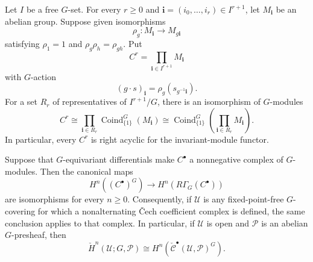 \begin{lemma}
\label{lemma-equivariant-cech-free-index}
\begin{reference}
\cite[Chapter V, \S 5.5, Proposition 5.5.4,
pp. 209--210]{Tohoku}
\end{reference}
Let $I$ be a free $G$-set. For every $r\geq 0$ and
$\mathbf{i}=(i_0,\ldots,i_r)\in I^{r+1}$, let $M_{\mathbf{i}}$ be an
abelian group. Suppose given isomorphisms
$$
\rho_g:M_{\mathbf{i}}\longrightarrow M_{g\mathbf{i}}
$$
satisfying $\rho_1=1$ and $\rho_g\rho_h=\rho_{gh}$. Put
$$
C^r=\prod_{\mathbf{i}\in I^{r+1}}M_{\mathbf{i}}
$$
with $G$-action
$$
(g\cdot s)_{\mathbf{i}}
=\rho_g(s_{g^{-1}\mathbf{i}}).
$$
For a set $R_r$ of representatives of $I^{r+1}/G$, there is an
isomorphism of $G$-modules
\begin{equation}
\label{equation-equivariant-cech-free-index-product}
C^r\cong
\prod_{\mathbf{i}\in R_r}
\operatorname{Coind}_{\{1\}}^G(M_{\mathbf{i}})
\cong
\operatorname{Coind}_{\{1\}}^G
\left(\prod_{\mathbf{i}\in R_r}M_{\mathbf{i}}\right).
\end{equation}
In particular, every $C^r$ is right acyclic for the invariant-module
functor.

Suppose that $G$-equivariant differentials make $C^\bullet$ a
nonnegative complex of $G$-modules. Then the canonical maps
$$
H^n((C^\bullet)^G)
\longrightarrow H^n(R\Gamma_G(C^\bullet))
$$
are isomorphisms for every $n\geq 0$. Consequently, if $\mathcal{U}$ is
any fixed-point-free $G$-covering for which a nonalternating \v Cech
coefficient complex is defined, the same conclusion applies to that
complex. In particular, if $\mathcal{U}$ is open and $\mathcal{P}$ is an
abelian $G$-presheaf, then
\begin{equation}
\label{equation-equivariant-cech-free-cover}
\check H^n(\mathcal{U};G,\mathcal{P})
\cong
H^n\left(
\check{\mathcal{C}}^\bullet(\mathcal{U},\mathcal{P})^G
\right).
\end{equation}
\end{lemma}

